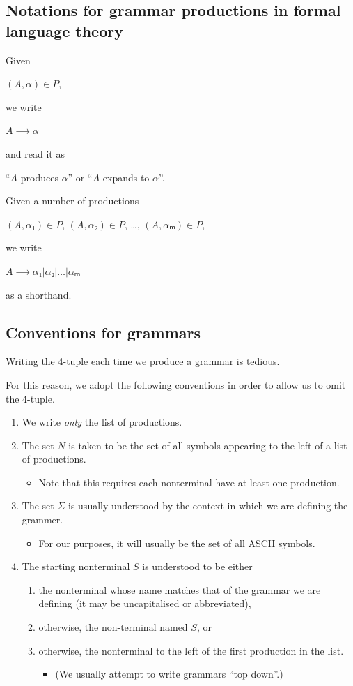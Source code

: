 \documentclass[11pt]{article}
\theoremstyle{definition}
\begin{document}
\subsection{Notations for grammar productions in formal language theory}
\label{sec:org86f62d1}

Given
\begin{center}
\((A, α) ∈ P\),
\end{center}
we write
\begin{center}
\(A ⟶ α\)
\end{center}
and read it as
\begin{center}
“\(A\) produces \(α\)” or “\(A\) expands to \(α\)”.
\end{center}

Given a number of
productions
\begin{center}
\((A, α₁) ∈ P\), \((A, α₂) ∈ P\), …, \((A, αₘ) ∈ P\),
\end{center}
we write
\begin{center}
\(A ⟶ α₁ | α₂ | … | αₘ\)
\end{center}
as a shorthand.

\subsection{Conventions for grammars}
\label{sec:org155f026}

Writing the 4-tuple each time we produce a grammar is tedious.

For this reason, we adopt the following conventions
in order to allow us to omit the 4-tuple.
\begin{enumerate}
\item We write \emph{only} the list of productions.
\item The set \(N\) is taken to be the set of all symbols
appearing to the left of a list of productions.
\begin{itemize}
\item Note that this requires each nonterminal have
at least one production.
\end{itemize}
\item The set \(Σ\) is usually understood by the context
in which we are defining the grammer.
\begin{itemize}
\item For our purposes, it will usually be the set of
all ASCII symbols.
\end{itemize}
\item The starting nonterminal \(S\) is understood to be either
\begin{enumerate}
\item the nonterminal whose name matches that of the grammar
we are defining (it may be uncapitalised or abbreviated),
\item otherwise, the non-terminal named \(S\), or
\item otherwise, the nonterminal to the left of
the first production in the list.
\begin{itemize}
\item (We usually attempt to write grammars “top down”.)
\end{itemize}
\end{enumerate}
\end{enumerate}
\end{document}
